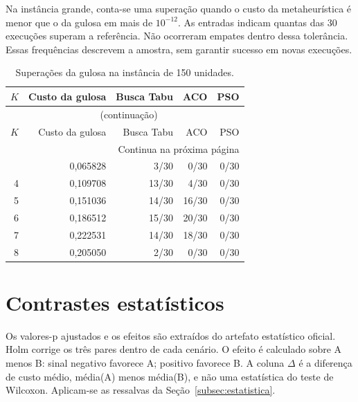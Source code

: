 Na instância grande, conta-se uma superação quando o custo da metaheurística é menor que o da gulosa em mais de $10^{-12}$. As entradas indicam quantas das 30 execuções superam a referência. Não ocorreram empates dentro dessa tolerância. Essas frequências descrevem a amostra, sem garantir sucesso em novas execuções.

\begingroup\small
\setlength{\tabcolsep}{5pt}
\begin{longtable}{rrrrr}
\caption{Superações da gulosa na instância de 150 unidades.}\label{tab:frequencias}\\
\toprule
$K$ & Custo da gulosa & Busca Tabu & ACO & PSO \\
\midrule
\endfirsthead
\multicolumn{5}{c}{\tablename~\thetable{} (continuação)}\\
\toprule
$K$ & Custo da gulosa & Busca Tabu & ACO & PSO \\
\midrule
\endhead
\midrule\multicolumn{5}{r}{Continua na próxima página}\\
\endfoot
\bottomrule
\endlastfoot
3 & 0,065828 & 3/30 & 0/30 & 0/30 \\
4 & 0,109708 & 13/30 & 4/30 & 0/30 \\
5 & 0,151036 & 14/30 & 16/30 & 0/30 \\
6 & 0,186512 & 15/30 & 20/30 & 0/30 \\
7 & 0,222531 & 14/30 & 18/30 & 0/30 \\
8 & 0,205050 & 2/30 & 0/30 & 0/30 \\
\end{longtable}
\endgroup

\clearpage\section{Contrastes estatísticos}\label{ap:contrastes}

Os valores-p ajustados e os efeitos são extraídos do artefato estatístico oficial. Holm corrige os três pares dentro de cada cenário. O efeito é calculado sobre A menos B: sinal negativo favorece A; positivo favorece B. A coluna $\Delta$ é a diferença de custo médio, média(A) menos média(B), e não uma estatística do teste de Wilcoxon. Aplicam-se as ressalvas da Seção~\ref{subsec:estatistica}.

